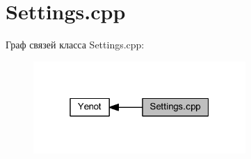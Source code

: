 \hypertarget{group__settingscpp}{}\section{Settings.\+cpp}
\label{group__settingscpp}
Граф связей класса Settings.\+cpp\+:
\nopagebreak
\begin{figure}[H]
\begin{center}
\leavevmode
\includegraphics[width=229pt]{group__settingscpp}
\end{center}
\end{figure}

